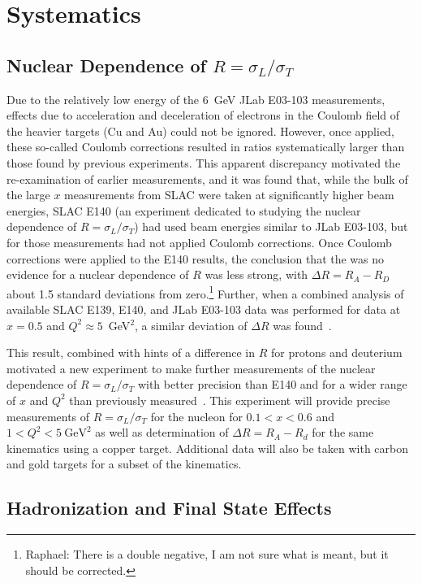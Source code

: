 \section{Systematics}
\subsection{Nuclear Dependence of $R=\sigma_L/\sigma_T$}


Due to the relatively low energy of the 6~GeV JLab E03-103 measurements, effects due to acceleration and
deceleration of electrons in the Coulomb field of the heavier targets (Cu and Au) could not be ignored.
However, once applied, these so-called Coulomb corrections resulted in ratios systematically larger
than those found by previous experiments.  This apparent discrepancy motivated the re-examination of
earlier measurements, and it was found that, while the bulk of the large $x$ measurements from SLAC
were taken at significantly higher beam energies, SLAC E140 (an experiment dedicated to studying
the nuclear dependence of $R=\sigma_L/\sigma_T$) had used beam energies similar to JLab E03-103, but for
those measurements had not applied Coulomb corrections.  Once Coulomb corrections were applied to the E140
results, the conclusion that the was no evidence for a nuclear dependence of $R$ was less strong, with
$\Delta R=R_A-R_D$ about 1.5 standard deviations from zero.\footnote{Raphael: There is a double negative, I am 
not sure what is meant, but it should be corrected.} Further, when a combined analysis
of available SLAC E139, E140, and JLab E03-103 data was performed for data at $x=0.5$ and $Q^2\approx5$~GeV$^2$,
a similar deviation of $\Delta R$ was found~\cite{Solvignon:2009it}.

This result, combined with hints of a difference in $R$ for protons and deuterium motivated a 
new experiment to make further measurements of the nuclear dependence of $R=\sigma_L/\sigma_T$
with better precision than E140 and for a wider range of $x$ and $Q^2$ than previously
measured~\cite{12gev_nucr}.  This experiment will provide precise measurements of $R=\sigma_L/\sigma_T$
for the nucleon for $0.1<x<0.6$ and $1<Q^2<5~\text{GeV}^2$ as well as determination of $\Delta R= R_A-R_d$ for the same
kinematics using a copper target. Additional data will also be taken with carbon and gold targets for a subset
of the kinematics.


\subsection{Hadronization and Final State Effects}

